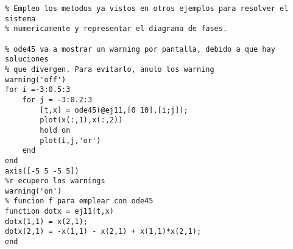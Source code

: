 \begin{lstlisting}
% Empleo los metodos ya vistos en otros ejemplos para resolver el sistema
% numericamente y representar el diagrama de fases.

% ode45 va a mostrar un warning por pantalla, debido a que hay soluciones
% que divergen. Para evitarlo, anulo los warning
warning('off')
for i =-3:0.5:3
    for j = -3:0.2:3
        [t,x] = ode45(@ej11,[0 10],[i;j]);
        plot(x(:,1),x(:,2))
        hold on
        plot(i,j,'or')
    end
end
axis([-5 5 -5 5])
%r ecupero los warnings
warning('on')
% funcion f para emplear con ode45
function dotx = ej11(t,x)
dotx(1,1) = x(2,1);
dotx(2,1) = -x(1,1) - x(2,1) + x(1,1)*x(2,1);
end
\end{lstlisting}